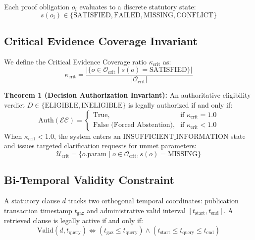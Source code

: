 \documentclass[conference]{IEEEtran}
\begin{document}
Each proof obligation $o_i$ evaluates to a discrete statutory state:
\begin{equation}
s(o_i) \in \{\text{SATISFIED}, \text{FAILED}, \text{MISSING}, \text{CONFLICT}\}
\end{equation}

\subsection{Critical Evidence Coverage Invariant}
We define the Critical Evidence Coverage ratio $\kappa_{\text{crit}}$ as:
\begin{equation}
\kappa_{\text{crit}} = \frac{|\{o \in \mathcal{O}_{\text{crit}} \mid s(o) = \text{SATISFIED}\}|}{|\mathcal{O}_{\text{crit}}|}
\end{equation}

\textbf{Theorem 1 (Decision Authorization Invariant):} An authoritative eligibility verdict $D \in \{\text{ELIGIBLE}, \text{INELIGIBLE}\}$ is legally authorized if and only if:
\begin{equation}
\mathrm{Auth}(\mathcal{EC}) = \begin{cases} 
\text{True}, & \text{if } \kappa_{\text{crit}} = 1.0 \\
\text{False (Forced Abstention)}, & \text{if } \kappa_{\text{crit}} < 1.0
\end{cases}
\end{equation}
When $\kappa_{\text{crit}} < 1.0$, the system enters an $\text{INSUFFICIENT\_INFORMATION}$ state and issues targeted clarification requests for unmet parameters:
\begin{equation}
\mathcal{U}_{\text{crit}} = \{o.\text{param} \mid o \in \mathcal{O}_{\text{crit}}, s(o) = \text{MISSING}\}
\end{equation}

\subsection{Bi-Temporal Validity Constraint}
A statutory clause $d$ tracks two orthogonal temporal coordinates: publication transaction timestamp $t_{\text{gaz}}$ and administrative valid interval $[t_{\text{start}}, t_{\text{end}}]$. A retrieved clause is legally active if and only if:
\begin{equation}
\mathrm{Valid}(d, t_{\text{query}}) \iff (t_{\text{gaz}} \le t_{\text{query}}) \land (t_{\text{start}} \le t_{\text{query}} \le t_{\text{end}})
\end{equation}
\end{document}
